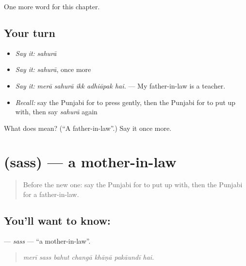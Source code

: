 \begin{grammarlens}[title={What you've built}]
One more word for this chapter.
\end{grammarlens}

\subsection*{Your turn}
\begin{itemize}
\raggedright
  \item \emph{Say it:} \emph{sahurā}
  \item \emph{Say it:} \emph{sahurā}, once more
  \item \emph{Say it:} \emph{merā sahurā ikk adhiāpak hai.} — My father-in-law is a teacher.
  \item \emph{Recall:} say the Punjabi for to press gently, then the Punjabi for to put up with, then say \emph{sahurā} again
\end{itemize}

\begin{tcolorbox}[breakable,colback=teal!4,colframe=teal!35!black,title={Before you move on}]
What does  mean? (\textquotedblleft{}A father-in-law\textquotedblright{}.) Say it once more.
\end{tcolorbox}
\section[\texorpdfstring{\pa{ਸੱਸ} (sass)}{ਸੱਸ (sass)}]{ (sass) — a mother-in-law}

\label{lesson:PA-C329-sass}



\begin{quote}
Before the new one: say the Punjabi for to put up with, then the Punjabi for a father-in-law.
\end{quote}

\subsection*{You'll want to know: }
\textbf{} — \emph{sass} — \textquotedblleft{}a mother-in-law\textquotedblright{}.

\begin{quote}
      
\end{quote}

\begin{quote}
\emph{merī sass bahut changā khāṇā pakāundī hai.}
\end{quote}

